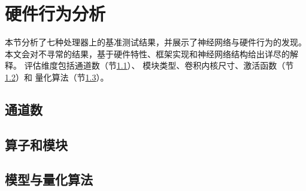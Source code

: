\section{硬件行为分析}
\label{analysis}
本节分析了七种处理器上的基准测试结果，并展示了神经网络与硬件行为的发现。
本文会对不寻常的结果，基于硬件特性、框架实现和神经网络结构给出详尽的解释。
评估维度包括通道数（节\ref{analysis:channels}）、
模块类型、卷积内核尺寸、激活函数（节\ref{analysis:op block}）和
量化算法（节\ref{analysis:model quantization}）。

\subsection{通道数}
\label{analysis:channels}

\subsection{算子和模块}
\label{analysis:op block}

\subsection{模型与量化算法}
\label{analysis:model quantization}